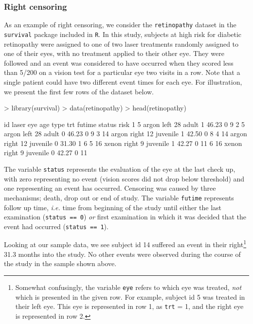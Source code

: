 \documentclass[a4paper]{article}
\begin{document}
    \subsubsection{Right censoring}
    
    As an example of right censoring, we consider the \texttt{retinopathy} dataset in the \texttt{survival} package included in \texttt{R}. In this study, subjects at high risk for diabetic retinopathy were assigned to one of two laser treatments randomly assigned to one of their eyes, with no treatment applied to their other eye. They were followed and an event was considered to have occurred when they scored less than 5/200 on a vision test for a particular eye two visits in a row. Note that a single patient could have two different event times for each eye. For illustration, we present the first few rows of the dataset below. 
    
\begin{Schunk}
\begin{Sinput}
> library(survival)
> data(retinopathy)
> head(retinopathy)
\end{Sinput}
\begin{Soutput}
  id laser   eye age     type trt futime status risk
1  5 argon  left  28    adult   1  46.23      0    9
2  5 argon  left  28    adult   0  46.23      0    9
3 14 argon right  12 juvenile   1  42.50      0    8
4 14 argon right  12 juvenile   0  31.30      1    6
5 16 xenon right   9 juvenile   1  42.27      0   11
6 16 xenon right   9 juvenile   0  42.27      0   11
\end{Soutput}
\end{Schunk}

  The variable \texttt{status} represents the evaluation of the eye at the last check up, with zero representing no event (vision scores did not drop below threshold) and one representing an event has occurred. Censoring was caused by three mechanisms; death, drop out or end of study. The variable \texttt{futime} represents follow up time, \emph{i.e.} time from beginning of the study until either the last examination (\texttt{status == 0}) \emph{or} first examination in which it was decided that the event had occurred (\texttt{status == 1}). 
  
  Looking at our sample data, we see subject id 14 suffered an event in their right\footnote{Somewhat confusingly, the variable \texttt{eye} refers to which eye was treated, \emph{not} which is presented in the given row. For example, subject id 5 was treated in their left eye. This eye is represented in row 1, as \texttt{trt} = 1, and the right eye is represented in row 2.} 31.3 months into the study. No other events were observed during the course of the study in the sample shown above. 
  
\end{document}
